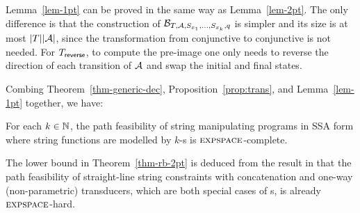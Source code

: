 
Lemma~\ref{lem-1pt} can be proved in the same way as Lemma~\ref{lem-2pt}. The only difference is that the construction of $\mathcal{B}_{T, \mathcal{A}, S_{x_1}, \ldots, S_{x_k}, q}$ is simpler and its size is at most $|T| |\mathcal{A}|$, since the transformation from  conjunctive \FFA{} to conjunctive \FA{} is not needed. For $T_{\sf reverse}$, to compute the pre-image one only needs to reverse the direction of each transition of $\mathcal{A}$ and swap the initial and final states.   

Combing Theorem~\ref{thm-generic-dec}, Proposition~\ref{prop:trans}, and Lemma~\ref{lem-1pt} together, we have:

\begin{theorem} \label{thm-rb-2pt}
For each $k \in \mathbb{N}$, the path feasibility of string manipulating programs in SSA form where string functions are modelled by $k$-\RBPPT{}s is $\textsc{expspace}$-complete. 
\end{theorem}

The lower bound in Theorem~\ref{thm-rb-2pt} is deduced from the result in \cite{LB16} that the path feasibility of straight-line string constraints with concatenation and one-way (non-parametric) transducers, which are both special cases of \PT{}s, is already $\textsc{expspace}$-hard.


